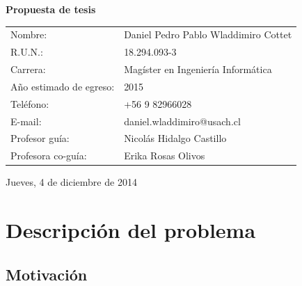 \documentclass[12pt,letterpaper]{article}
\begin{document}
	\vspace{0.5cm}
	\begin{center}
	\large
		\textbf{Propuesta de tesis}
	\end{center}
	
	\vspace*{4.25cm}
	\begin{flushright}
		\begin{tabular}[t]{l l}
			Nombre: & Daniel Pedro Pablo Wladdimiro Cottet \\
			R.U.N.: & 18.294.093-3\\
			Carrera: & Magíster en Ingeniería Informática\\
			A\~no estimado de egreso: & 2015\\
			Tel\'efono: & +56 9 82966028\\
			E-mail: & daniel.wladdimiro@usach.cl\\
			Profesor guía: & Nicolás Hidalgo Castillo\\
			Profesora co-guía: & Erika Rosas Olivos

		\end{tabular}
	\end{flushright}
	\begin{center}
		\vspace{1.5cm}
		Jueves, 4 de diciembre de 2014
	\end{center}

\newpage
\tableofcontents
\thispagestyle{empty}

\newpage
\renewcommand{\thepage}{\arabic{page}}
\setcounter{page}{1}

\section{Descripción del problema}
\subsection{Motivación}

\end{document}

